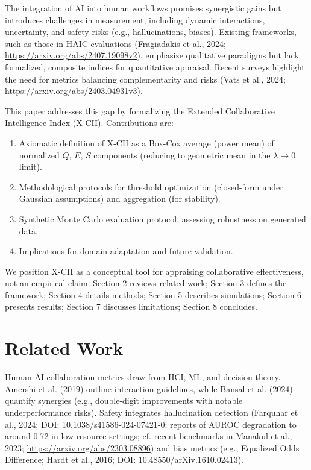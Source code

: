 \documentclass{article}
\begin{document}
The integration of AI into human workflows promises synergistic gains but introduces challenges in measurement, including dynamic interactions, uncertainty, and safety risks (e.g., hallucinations, biases). Existing frameworks, such as those in HAIC evaluations (Fragiadakis et al., 2024; \url{https://arxiv.org/abs/2407.19098v2}), emphasize qualitative paradigms but lack formalized, composite indices for quantitative appraisal. Recent surveys highlight the need for metrics balancing complementarity and risks (Vats et al., 2024; \url{https://arxiv.org/abs/2403.04931v3}).

This paper addresses this gap by formalizing the Extended Collaborative Intelligence Index (X-CII). Contributions are:
\begin{enumerate}
\item Axiomatic definition of X-CII as a Box-Cox average (power mean) of normalized $Q$, $E$, $S$ components (reducing to geometric mean in the $\lambda \to 0$ limit).
\item Methodological protocols for threshold optimization (closed-form under Gaussian assumptions) and aggregation (for stability).
\item Synthetic Monte Carlo evaluation protocol, assessing robustness on generated data.
\item Implications for domain adaptation and future validation.
\end{enumerate}

We position X-CII as a conceptual tool for appraising collaborative effectiveness, not an empirical claim. Section 2 reviews related work; Section 3 defines the framework; Section 4 details methods; Section 5 describes simulations; Section 6 presents results; Section 7 discusses limitations; Section 8 concludes.

\section{Related Work}

Human-AI collaboration metrics draw from HCI, ML, and decision theory. Amershi et al. (2019) outline interaction guidelines, while Bansal et al. (2024) quantify synergies (e.g., double-digit improvements with notable underperformance risks). Safety integrates hallucination detection (Farquhar et al., 2024; DOI: 10.1038/s41586-024-07421-0; reports of AUROC degradation to around 0.72 in low-resource settings; cf. recent benchmarks in Manakul et al., 2023; \url{https://arxiv.org/abs/2303.08896}) and bias metrics (e.g., Equalized Odds Difference; Hardt et al., 2016; DOI: 10.48550/arXiv.1610.02413).
\end{document}
